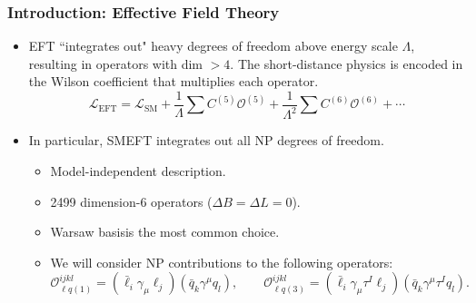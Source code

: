 \documentclass[mathserif, 10pt]{beamer}
\begin{document}
\begin{frame}\frametitle{Introduction: Effective Field Theory}
    \def\beamertemplatetransparentcoveredmedium{}
    \beamertemplatetransparentcoveredmedium
    \begin{itemize}
        \item  EFT ``integrates out" heavy degrees of freedom above energy scale $\Lambda$, resulting in operators with dim $> 4$. The short-distance physics is encoded in the Wilson coefficient that multiplies each operator.
              $$\mathcal{L}_\mathrm{EFT} = \mathcal{L}_\mathrm{SM} + \frac{1}{\Lambda}\sum C^{(5)} \mathcal{O}^{(5)} + \frac{1}{\Lambda^2}\sum C^{(6)} \mathcal{O}^{(6)} + \cdots$$
              \vspace{-2mm}
        \item In particular, SMEFT integrates out all NP degrees of freedom.
              \begin{itemize}
                  \item Model-independent description.
                  \item 2499 dimension-6 operators ($\Delta B = \Delta L = 0$).
\item Warsaw basis\footnotemark[3] is the most common choice.
                  \item We will consider NP contributions to the following operators:
                        $$\mathcal{O}_{\ell q(1)}^{ijkl} = (\bar{\ell}_i \gamma_\mu \ell_j)(\bar{q}_k \gamma^\mu  q_l), \qquad \mathcal{O}_{\ell q(3)}^{ijkl} = (\bar{\ell}_i \gamma_\mu \tau^I \ell_j)(\bar{q}_k \gamma^\mu \tau^I q_l).$$
              \end{itemize}
    \end{itemize}
\end{frame}
\end{document}

